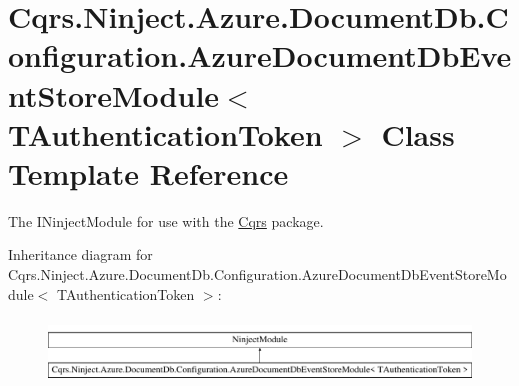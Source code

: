 \hypertarget{classCqrs_1_1Ninject_1_1Azure_1_1DocumentDb_1_1Configuration_1_1AzureDocumentDbEventStoreModule}{}\section{Cqrs.\+Ninject.\+Azure.\+Document\+Db.\+Configuration.\+Azure\+Document\+Db\+Event\+Store\+Module$<$ T\+Authentication\+Token $>$ Class Template Reference}
\label{classCqrs_1_1Ninject_1_1Azure_1_1DocumentDb_1_1Configuration_1_1AzureDocumentDbEventStoreModule}


The I\+Ninject\+Module for use with the \hyperlink{namespaceCqrs}{Cqrs} package.  


Inheritance diagram for Cqrs.\+Ninject.\+Azure.\+Document\+Db.\+Configuration.\+Azure\+Document\+Db\+Event\+Store\+Module$<$ T\+Authentication\+Token $>$\+:\begin{figure}[H]
\begin{center}
\leavevmode
\includegraphics[height=1.744548cm]{classCqrs_1_1Ninject_1_1Azure_1_1DocumentDb_1_1Configuration_1_1AzureDocumentDbEventStoreModule}
\end{center}
\end{figure}
